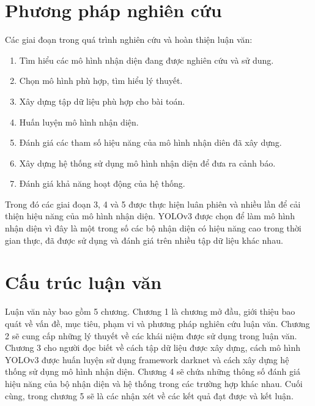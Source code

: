 \section{Phương pháp nghiên cứu}
Các giai đoạn trong quá trình nghiên cứu và hoàn thiện luận văn:
\begin{enumerate}
	\item Tìm hiểu các mô hình nhận diện đang được nghiên cứu và sử dung.
	\item Chọn mô hình phù hợp, tìm hiểu lý thuyết.
	\item Xây dựng tập dữ liệu phù hợp cho bài toán.
	\item Huấn luyện mô hình nhận diện.
	\item Đánh giá các tham số hiệu năng của mô hình nhận diên đã xây dựng.
	\item Xây dựng hệ thống sử dụng mô hình nhận diện để đưa ra cảnh báo.
	\item Đánh giá khả năng hoạt động của hệ thống.
\end{enumerate}
Trong đó các giai đoạn 3, 4 và 5 được thực hiện luân phiên và nhiều lần để cải thiện hiệu năng của mô hình nhận diện. YOLOv3 được chọn để làm mô hình nhận diện vì đây là một trong số các bộ nhận diện có hiệu năng cao trong thời gian thực, đã được sử dụng và đánh giá trên nhiều tập dữ liệu khác nhau.

\section{Cấu trúc luận văn}
Luận văn này bao gồm 5 chương. Chương 1 là chương mở đầu, giới thiệu bao quát về vấn đề, mục tiêu, phạm vi và phương pháp nghiên cứu luận văn. Chương 2 sẽ cung cấp những lý thuyết về các khái niệm được sử dụng trong luận văn. Chương 3 cho người đọc biết về cách tập dữ liệu được xây dựng, cách mô hình YOLOv3 được huấn luyện sử dụng framework darknet và cách xây dựng hệ thống sử dụng mô hình nhận diện. Chương 4 sẽ chứa những thông số đánh giá hiệu năng của bộ nhận diện và hệ thống trong các trường hợp khác nhau. Cuối cùng, trong chương 5 sẽ là các nhận xét về các kết quả đạt được và kết luận.